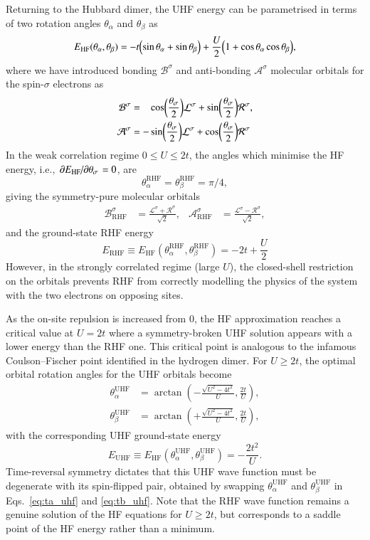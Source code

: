 \documentclass[aps,prb,reprint,noshowkeys,superscriptaddress]{revtex4-1}
\newcommand{\latin}[1]{#1}
\newcommand{\ie}{\latin{i.e.}}
\newcommand{\ta}{\theta_{\alpha}}
\newcommand{\tb}{\theta_{\beta}}
\newcommand{\Lsi}{\mathcal{L}^{\sigma}}
\newcommand{\Rsi}{\mathcal{R}^{\sigma}}
\begin{document}
Returning to the Hubbard dimer, the UHF energy can be parametrised in terms of two rotation angles $\ta$ and $\tb$ as
\begin{equation}
E_\text{HF}(\ta, \tb) = -t \qty( \sin \ta + \sin \tb ) + \frac{U}{2} \qty( 1 + \cos \ta \cos \tb ),
\end{equation}
where we have introduced bonding $\mathcal{B}^{\sigma}$ and anti-bonding $\mathcal{A}^{\sigma}$ molecular orbitals for 
the spin-$\sigma$ electrons as
\begin{align}
    \mathcal{B}^{\sigma} & = \hphantom{-} \cos(\frac{\theta_\sigma}{2}) \Lsi + \sin(\frac{\theta_\sigma}{2}) \Rsi,
	\\
	\mathcal{A}^{\sigma} & = - \sin(\frac{\theta_\sigma}{2}) \Lsi + \cos(\frac{\theta_\sigma}{2}) \Rsi
\end{align}
In the weak correlation regime $0 \le U \le 2t$, the angles which minimise the HF energy, 
\ie, $\pdv*{E_\text{HF}}{\theta_\sigma} = 0$, are 
\begin{equation}
	\ta^\text{RHF} = \tb^\text{RHF} = \pi/4,
\end{equation}
giving the symmetry-pure molecular orbitals
\begin{align}
	\mathcal{B}_\text{RHF}^{\sigma} & = \frac{\Lsi + \Rsi}{\sqrt{2}},
	&
	\mathcal{A}_\text{RHF}^{\sigma} & = \frac{\Lsi - \Rsi}{\sqrt{2}},
\end{align}
and the ground-state RHF energy
\begin{equation}
	E_\text{RHF} \equiv E_\text{HF}(\ta^\text{RHF}, \tb^\text{RHF}) = -2t + \frac{U}{2}
\end{equation}
However, in the strongly correlated regime (large $U$), the closed-shell restriction on the orbitals prevents RHF from 
correctly modelling the physics of the system with the two electrons on opposing sites.

As the on-site repulsion is increased from 0, the HF approximation reaches a critical value at $U=2t$ where a symmetry-broken 
UHF solution appears with a lower energy than the RHF one.
This critical point is analogous to the infamous Coulson--Fischer point identified in the hydrogen dimer.\cite{Coulson_1949}
For $U \ge 2t$, the optimal orbital rotation angles for the UHF orbitals become
\begin{align}
	\ta^\text{UHF} & = \arctan (-\frac{\sqrt{U^2 - 4t^2}}{U},\frac{2t}{U}),
    \label{eq:ta_uhf}
	\\
	\tb^\text{UHF} & = \arctan (+\frac{\sqrt{U^2 - 4t^2}}{U},\frac{2t}{U}),
    \label{eq:tb_uhf}
\end{align}
with the corresponding UHF ground-state energy
\begin{equation}
	E_\text{UHF} \equiv E_\text{HF}(\ta^\text{UHF}, \tb^\text{UHF}) = - \frac{2t^2}{U}.
\end{equation}
Time-reversal symmetry dictates that this UHF wave function must be degenerate with its spin-flipped pair, obtained 
by swapping $\ta^{\text{UHF}}$ and $\tb^{\text{UHF}}$ in Eqs.~\eqref{eq:ta_uhf} and \eqref{eq:tb_uhf}.
Note that the RHF wave function remains a genuine solution of the HF equations for $U \ge 2t$, but corresponds to a saddle point 
of the HF energy rather than a minimum.
\end{document}
